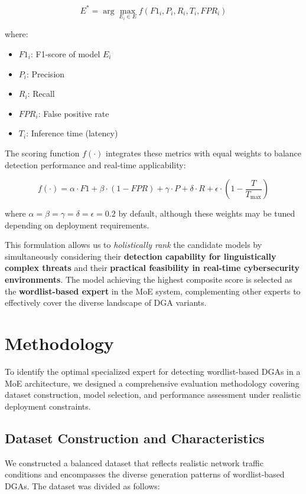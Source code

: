 \documentclass[a4paper]{llncs}
\begin{document}
\begin{equation}
E^* = \arg\max_{E_i \in E} f(F1_i, P_i, R_i, T_i, FPR_i)
\end{equation}

where:
\begin{itemize}
    \item $F1_i$: F1-score of model $E_i$
    \item $P_i$: Precision
    \item $R_i$: Recall
    \item $FPR_i$: False positive rate
    \item $T_i$: Inference time (latency)
\end{itemize}

The scoring function $f(\cdot)$ integrates these metrics with equal weights to balance detection performance and real-time applicability:

\begin{equation}
f(\cdot) = \alpha \cdot F1 + \beta \cdot (1 - FPR) + \gamma \cdot P + \delta \cdot R + \epsilon \cdot \left(1 - \frac{T}{T_{\text{max}}}\right)
\end{equation}

where $\alpha = \beta = \gamma = \delta = \epsilon = 0.2$ by default, although these weights may be tuned depending on deployment requirements.

This formulation allows us to \textit{holistically rank} the candidate models by simultaneously considering their \textbf{detection capability for linguistically complex threats} and their \textbf{practical feasibility in real-time cybersecurity environments}. The model achieving the highest composite score is selected as the \textbf{wordlist-based expert} in the MoE system, complementing other experts to effectively cover the diverse landscape of DGA variants.





\section{Methodology}
\label{sec:methodology}

To identify the optimal specialized expert for detecting wordlist-based DGAs in a MoE architecture, we designed a comprehensive evaluation methodology covering dataset construction, model selection, and performance assessment under realistic deployment constraints.

\subsection{Dataset Construction and Characteristics}
\label{subsec:dataset}
We constructed a balanced dataset that reflects realistic network traffic conditions and encompasses the diverse generation patterns of wordlist-based DGAs. The dataset was divided as follows:
\end{document}
